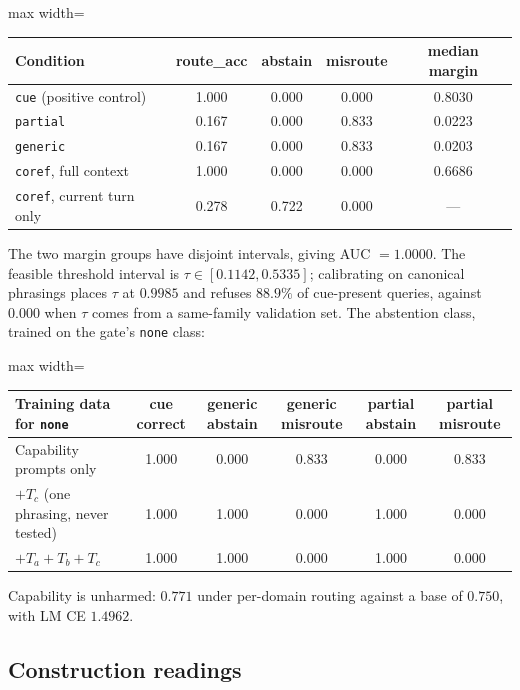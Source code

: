 \documentclass[11pt,a4paper]{article}
\begin{document}
\begin{center}\small
\begin{adjustbox}{max width=\linewidth}
\begin{tabular}{@{}lcccc@{}}
\toprule
Condition & route\_acc & abstain & misroute & median margin \\
\midrule
\texttt{cue} (positive control) & 1.000 & 0.000 & 0.000 & 0.8030 \\
\texttt{partial} & 0.167 & 0.000 & 0.833 & 0.0223 \\
\texttt{generic} & 0.167 & 0.000 & 0.833 & 0.0203 \\
\texttt{coref}, full context & 1.000 & 0.000 & 0.000 & 0.6686 \\
\texttt{coref}, current turn only & 0.278 & 0.722 & 0.000 & --- \\
\bottomrule
\end{tabular}
\end{adjustbox}
\end{center}

The two margin groups have disjoint intervals, giving AUC $=1.0000$. The
feasible threshold interval is $\tau\in[0.1142,0.5335]$; calibrating on
canonical phrasings places $\tau$ at $0.9985$ and refuses $88.9\%$ of
cue-present queries, against $0.000$ when $\tau$ comes from a same-family
validation set. The abstention class, trained on the gate's \texttt{none} class:

\begin{center}\small
\begin{adjustbox}{max width=\linewidth}
\begin{tabular}{@{}lccccc@{}}
\toprule
Training data for \texttt{none} & cue correct & generic abstain &
generic misroute & partial abstain & partial misroute \\
\midrule
Capability prompts only & 1.000 & 0.000 & 0.833 & 0.000 & 0.833 \\
$+T_c$ (one phrasing, never tested) & 1.000 & 1.000 & 0.000 & 1.000 & 0.000 \\
$+T_a+T_b+T_c$ & 1.000 & 1.000 & 0.000 & 1.000 & 0.000 \\
\bottomrule
\end{tabular}
\end{adjustbox}
\end{center}

Capability is unharmed: $0.771$ under per-domain routing against a base of
$0.750$, with LM CE $1.4962$.

\subsection{Construction readings}
\label{app:synth}
\end{document}
